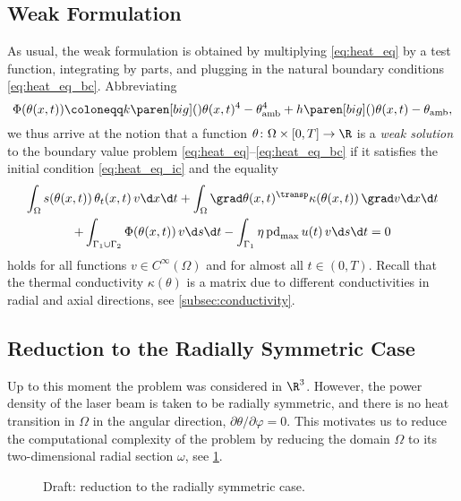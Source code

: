 \subsection{Weak Formulation}

As usual, the weak formulation is obtained by multiplying \eqref{eq:heat_eq} by a test function, integrating by parts, and plugging in the natural boundary conditions \eqref{eq:heat_eq_bc}.
Abbreviating
\begin{equation*}
	\Phi(\theta(x,t)) 
	\coloneqq 
	k \paren[big](){\theta(x,t)^4 - \theta_\text{amb}^4} + h \paren[big](){\theta(x,t) - \theta_\text{amb}}
	,
\end{equation*}
we thus arrive at the notion that a function $\theta \colon \Omega \times [0,T] \to \R$ is a \emph{weak solution} to the boundary value problem \eqref{eq:heat_eq}--\eqref{eq:heat_eq_bc} if it satisfies the initial condition \eqref{eq:heat_eq_ic} and the equality
\begin{multline} \label{eq:weak}
	\int_\Omega s(\theta(x,t)) \, \theta_t(x,t) \, v \d x \d t
	+
	\int_\Omega \grad \theta(x,t)^\transp \kappa(\theta(x,t)) \, \grad v \d x \d t 
	\\
	+
	\int_{\Gamma_1 \cup \Gamma_2} \Phi(\theta(x,t))\, v\d s \d t -
	\int_{\Gamma_1} \eta \, \text{pd}_{\max} \, u(t) \, v \d s \d t 
	= 
	0
\end{multline}
holds for all functions $v \in C^\infty(\Omega)$ and for almost all $t \in (0,T)$.
Recall that the thermal conductivity $\kappa(\theta)$ is a matrix due to different conductivities in radial and axial directions, see \cref{subsec:conductivity}.


\subsection{Reduction to the Radially Symmetric Case}

Up to this moment the problem was considered in $\R^3$.
However, the power density of the laser beam is taken to be radially symmetric, and there is no heat transition in $\Omega$ in the angular direction, \ie $\partial\theta/\partial\varphi = 0$. 
This motivates us to reduce the computational complexity of the problem by reducing the domain $\Omega$ to its two-dimensional radial section $\omega$, see \cref{fig:sec}.

\begin{figure}
	\centering
	
	
	\caption{Draft: reduction to the radially symmetric case.}
	\label{fig:sec}
\end{figure}

